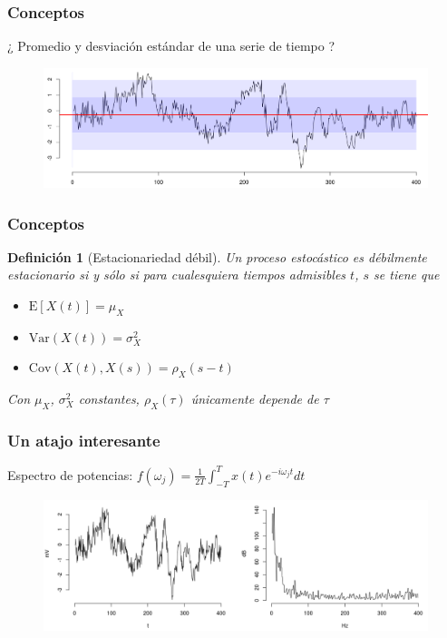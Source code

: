 \documentclass[serif,mathserif,professionalfont]{beamer}
\newtheorem{definicion}{Definición}
\newcommand{\simint}[1]{\int_{- #1 }^{ #1 }}
\newcommand{\E}[1]{\mathrm{E}\left[ #1 \right]}
\newcommand{\Var}[1]{\mathrm{Var}\left( #1 \right)}
\newcommand{\Cov}[1]{\mathrm{Cov}\left( #1 \right)}
\begin{document}

\begin{frame}\frametitle{Conceptos}
¿ Promedio y desviación estándar de una serie de tiempo ?
\begin{figure}
\centering
\includegraphics[width=\linewidth]{./curso_scripts/serie_mu.png}
\end{figure}
\end{frame}


\begin{frame}\frametitle{Conceptos}
\begin{definicion}[Estacionariedad débil]
Un proceso estocástico es débilmente estacionario si y sólo si para cualesquiera tiempos 
admisibles $t$, $s$ se tiene que
\begin{itemize}
\item $\E{X(t)} = \mu_X$
\item $\Var{X(t)} = \sigma^{2}_X$
\item $\Cov{X(t),X(s)} = \rho_X (s-t)$
\end{itemize}
Con $\mu_X$, $\sigma^{2}_X$ constantes, $\rho_X(\tau)$ únicamente depende de $\tau$
\end{definicion}
\end{frame}


\begin{frame}\frametitle{Un atajo interesante}
Espectro de potencias: 
$f(\omega_j) = \frac{1}{2 T} \simint{T} x(t) e^{-i \omega_j t} dt$
\begin{figure}
\centering
\includegraphics[width=\linewidth]{./curso_scripts/spec.png}
\end{figure}
\end{frame}
\end{document}
